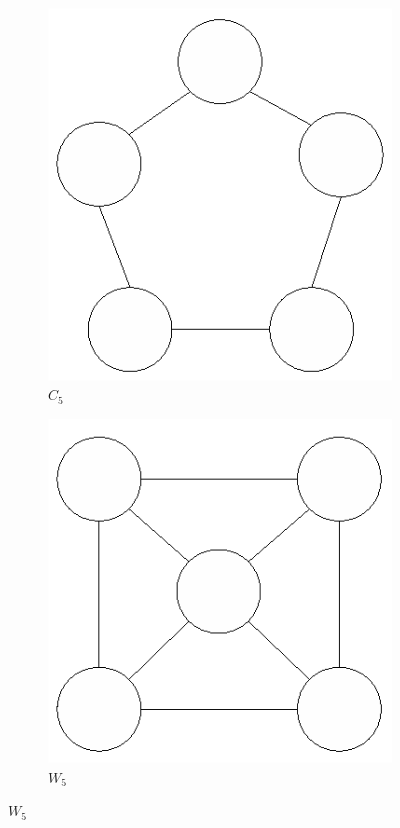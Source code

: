 \begin{figure}
\begin{subfigure}{.26\textwidth}
\end{subfigure}
\begin{subfigure}{.26\textwidth}
  \centering
  \includegraphics[width=.8\linewidth]{figs/C5.eps}
  \caption{$C_5$}
  \label{fig:notable-C5}
\end{subfigure}
\newline
  \centering
\begin{subfigure}{.26\textwidth}
  \centering
  \includegraphics[width=.8\linewidth]{figs/W5.eps}
  \caption{$W_5$}
  \label{fig:notable-W5}
\end{subfigure}

\end{figure}
